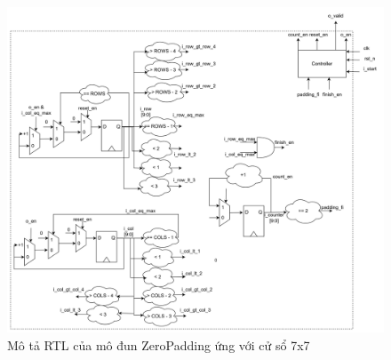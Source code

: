 \begin{figure}[!ht]
    \centering
    \includegraphics[width=\linewidth]{figures/zero7x7Architecture1.png}
    \caption{Mô tả RTL của mô đun ZeroPadding ứng với cử sổ 7x7}
    \label{fig:zero7x7Architecture1}
\end{figure}

